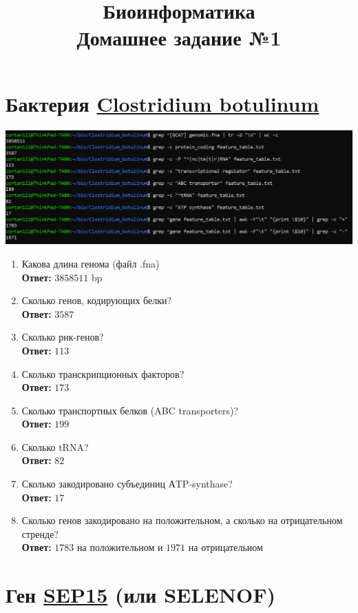\documentclass{article}
\title{Биоинформатика \\ Домашнее задание №1}
\begin{document}
  \maketitle

  \section{Бактерия \href{https://en.wikipedia.org/wiki/Clostridium_botulinum}{Clostridium botulinum}}
  \includegraphics[width=\textwidth]{./bio/hw1/bacteria.png}

  \begin{enumerate}
    \item Какова длина генома (файл .fna) \\
      \textbf{Ответ:} $3858511$ bp
    \item Сколько генов, кодирующих белки? \\
      \textbf{Ответ:} $3587$
    \item Сколько рнк-генов? \\
      \textbf{Ответ:} $113$
    \item Сколько транскрипционных факторов? \\
      \textbf{Ответ:} $173$
    \item Сколько транспортных белков (ABC transporters)? \\
      \textbf{Ответ:} $199$
    \item Сколько tRNA? \\
      \textbf{Ответ:} $82$
    \item Сколько закодировано субъединиц АTP-synthase? \\
      \textbf{Ответ:} $17$
    \item Сколько генов закодировано на положительном, а сколько на отрицательном стренде? \\
      \textbf{Ответ:} $1783$ на положительном и $1971$ на отрицательном
  \end{enumerate}

  \section{Ген \href{https://en.wikipedia.org/wiki/SEP15}{SEP15} (или SELENOF)}
\end{document}
